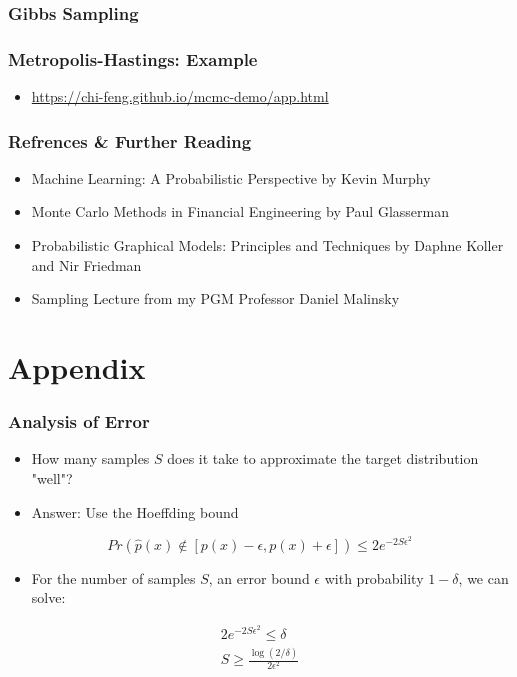 \documentclass{beamer}
\begin{document}
\begin{frame}
\frametitle{Gibbs Sampling}
\end{frame}



\begin{frame}
  \frametitle{Metropolis-Hastings: Example}
  \begin{itemize}
    \item \url{https://chi-feng.github.io/mcmc-demo/app.html}
  \end{itemize}
\end{frame}



\begin{frame}
\frametitle{Refrences \& Further Reading}
  \begin{itemize}
    \item Machine Learning: A Probabilistic Perspective by Kevin Murphy
    \item Monte Carlo Methods in Financial Engineering by Paul Glasserman
    \item Probabilistic Graphical Models: Principles and Techniques by Daphne Koller and Nir Friedman
    \item Sampling Lecture from my PGM Professor Daniel Malinsky
  \end{itemize}
\end{frame}


\section{Appendix}
\begin{frame}
  \frametitle{Analysis of Error}
  \begin{itemize}
    \item How many samples $S$ does it take to approximate the target distribution "well"?
    \item Answer: Use the Hoeffding bound
  \end{itemize}
  \begin{equation*}
    Pr \left( \hat{p}(x) \not\in \left[p(x) - \epsilon, p(x) + \epsilon \right] \right) \leq 2 e^{-2S \epsilon^2}
  \end{equation*}
  \begin{itemize}
    \item For the number of samples $S$, an error bound $\epsilon$ with probability $1 - \delta$,
      we can solve:
  \end{itemize}
  \begin{gather*}
    2e^{-2S \epsilon^2} \leq \delta \\
    S \geq \frac{\log(2 / \delta)}{2 \epsilon^2}  \\
  \end{gather*}
\end{frame}
\end{document}
